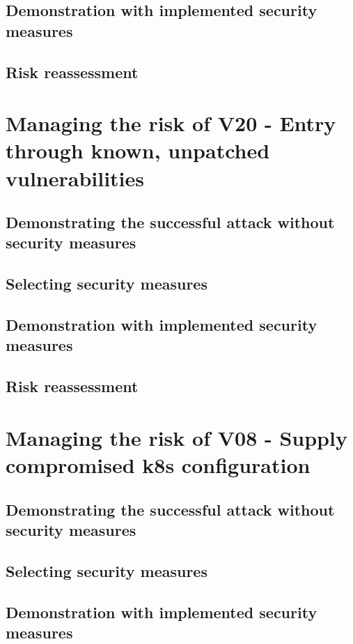 \subsection{Demonstration with implemented security measures}

\subsection{Risk reassessment}

\section{Managing the risk of V20 - Entry through known, unpatched vulnerabilities}

\subsection{Demonstrating the successful attack without security measures}

\subsection{Selecting security measures}

\subsection{Demonstration with implemented security measures}

\subsection{Risk reassessment}

\section{Managing the risk of V08 - Supply compromised k8s configuration}

\subsection{Demonstrating the successful attack without security measures}

\subsection{Selecting security measures}

\subsection{Demonstration with implemented security measures}

